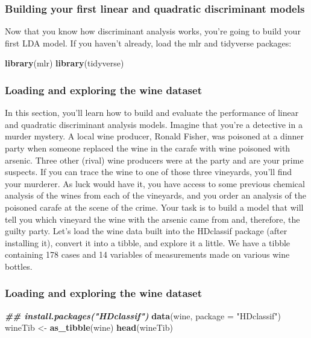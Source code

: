 \documentclass[
]{article}
\newenvironment{Shaded}{\begin{snugshade}}{\end{snugshade}}
\newcommand{\AttributeTok}[1]{\textcolor[rgb]{0.13,0.29,0.53}{#1}}
\newcommand{\DocumentationTok}[1]{\textcolor[rgb]{0.56,0.35,0.01}{\textbf{\textit{#1}}}}
\newcommand{\FunctionTok}[1]{\textcolor[rgb]{0.13,0.29,0.53}{\textbf{#1}}}
\newcommand{\NormalTok}[1]{#1}
\newcommand{\OtherTok}[1]{\textcolor[rgb]{0.56,0.35,0.01}{#1}}
\newcommand{\StringTok}[1]{\textcolor[rgb]{0.31,0.60,0.02}{#1}}
\begin{document}
\subsubsection{Building your first linear and quadratic discriminant
models}\label{building-your-first-linear-and-quadratic-discriminant-models}

Now that you know how discriminant analysis works, you're going to build
your first LDA model. If you haven't already, load the mlr and tidyverse
packages:

\begin{Shaded}
\begin{Highlighting}[]
\FunctionTok{library}\NormalTok{(mlr)}
\FunctionTok{library}\NormalTok{(tidyverse)}
\end{Highlighting}
\end{Shaded}

\subsubsection{Loading and exploring the wine
dataset}\label{loading-and-exploring-the-wine-dataset}

In this section, you'll learn how to build and evaluate the performance
of linear and quadratic discriminant analysis models. Imagine that
you're a detective in a murder mystery. A local wine producer, Ronald
Fisher, was poisoned at a dinner party when someone replaced the wine in
the carafe with wine poisoned with arsenic. Three other (rival) wine
producers were at the party and are your prime suspects. If you can
trace the wine to one of those three vineyards, you'll find your
murderer. As luck would have it, you have access to some previous
chemical analysis of the wines from each of the vineyards, and you order
an analysis of the poisoned carafe at the scene of the crime. Your task
is to build a model that will tell you which vineyard the wine with the
arsenic came from and, therefore, the guilty party. Let's load the wine
data built into the HDclassif package (after installing it), convert it
into a tibble, and explore it a little. We have a tibble containing 178
cases and 14 variables of measurements made on various wine bottles.

\subsubsection{Loading and exploring the wine
dataset}\label{loading-and-exploring-the-wine-dataset-1}

\begin{Shaded}
\begin{Highlighting}[]
\DocumentationTok{\#\# install.packages("HDclassif")}
\FunctionTok{data}\NormalTok{(wine, }\AttributeTok{package =} \StringTok{"HDclassif"}\NormalTok{)}
\NormalTok{wineTib }\OtherTok{\textless{}{-}} \FunctionTok{as\_tibble}\NormalTok{(wine)}
\FunctionTok{head}\NormalTok{(wineTib)}
\end{Highlighting}
\end{Shaded}
\end{document}
